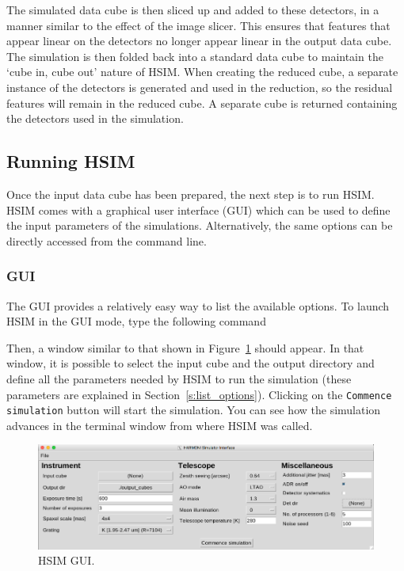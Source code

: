 \documentclass[12pt]{report}
\begin{document}
The simulated data cube is then sliced up and added to these detectors, in a manner similar to the effect of the image slicer. This ensures that features that appear linear on the detectors no longer appear linear in the output data cube. The simulation is then folded back into a standard data cube to maintain the `cube in, cube out' nature of HSIM. When creating the reduced cube, a separate instance of the detectors is generated and used in the reduction, so the residual features will remain in the reduced cube. A separate cube is returned containing the detectors used in the simulation.

\subsection{Running HSIM}

Once the input data cube has been prepared, the next step is to run HSIM. HSIM comes with a graphical user interface (GUI) which can be used to define the input parameters of the simulations. Alternatively, the same options can be directly accessed from the command line.

\subsubsection{GUI}

The GUI provides a relatively easy way to list the available options. To launch HSIM in the GUI mode, type the following command\\


Then, a window similar to that shown in Figure~\ref{fig:hsimgui} should appear. In that window, it is possible to select the input cube and the output directory and define all the parameters needed by HSIM to run the simulation (these parameters are explained in Section~\ref{s:list_options}). Clicking on the \texttt{Commence simulation} button will start the simulation. You can see how the simulation advances in the terminal window from where HSIM was called.

\begin{figure}[!h]
\centering
\includegraphics[width=\textwidth]{HSIM_GUI.png}
\caption{\small HSIM GUI.}\label{fig:hsimgui}
\end{figure}
\end{document}
